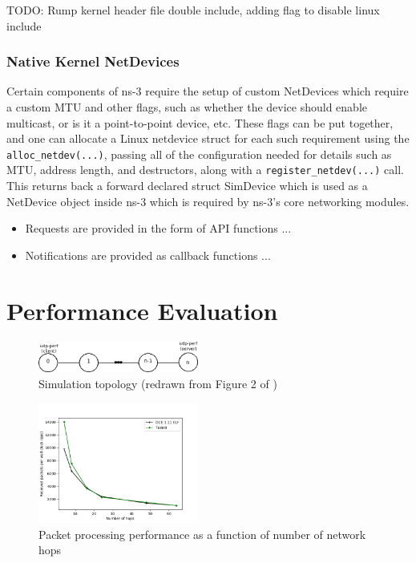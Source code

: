 \documentclass{sig-alternate}
\begin{document}
TODO: Rump kernel header file double include, adding flag to disable linux include

\subsubsection{Native Kernel NetDevices}
Certain components of ns-3 require the setup of custom NetDevices which require a custom MTU and other flags, such as whether the device should enable multicast, 
or is it a point-to-point device, etc. These flags can be put together, and one can allocate a Linux netdevice struct for each such requirement using
the \texttt{alloc\_netdev(...)}, passing all of the configuration needed for details such as MTU, address length, and destructors, along with a \texttt{register\_netdev(...)} call.
This returns back a forward declared struct SimDevice which is used as a NetDevice object inside ns-3 which is required by ns-3's core networking modules.

\begin{itemize}
 \item Requests are provided in the form of API functions ...
 \item Notifications are provided as callback functions ...
\end{itemize}

\section{Performance Evaluation}

\begin{figure}[h!]
  \centering
    \includegraphics[width=0.47\textwidth]{figs/topology.png}
  \caption{Simulation topology (redrawn from Figure 2 of \cite{Tazaki13})}
  \label{fig:topology}
\end{figure}

\begin{figure}[h!]
  \centering
    \includegraphics[width=0.47\textwidth]{figs/hops-vs-pps.png}
  \caption{Packet processing performance as a function of number of network hops}
  \label{fig:hops-vs-pps}
\end{figure}
\end{document}

